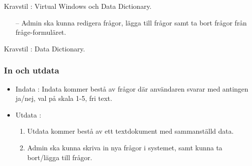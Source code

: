 \documentclass[12pt]{article}
\begin{document}
\begin{itemize}
\begin{itemize}
        \end{itemize}
          \begin{description}
              \item Kravstil : Virtual Windows och Data Dictionary.
          \end{description}
          
          \begin{itemize}
            \item [--]Admin ska kunna redigera frågor, lägga till frågor samt ta bort frågor från fråge-formuläret.

        \end{itemize}
          \begin{description}
              \item Kravstil : Data Dictionary.
          \end{description}
    \end{itemize}
  
 \subsubsection{In och utdata}
   \begin{itemize}
       \item Indata : Indata kommer bestå av frågor där användaren svarar med antingen ja/nej, val på skala 1-5, fri text.
          
          \item Utdata :
            \begin{enumerate}
                \item  Utdata kommer bestå av ett textdokument med sammanställd data.
                \item Admin ska kunna skriva in nya frågor i systemet, samt kunna ta bort/lägga till frågor.
            \end{enumerate}
              
   \end{itemize}
   
\end{document}
